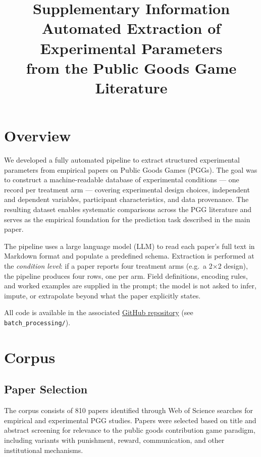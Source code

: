 \documentclass[11pt,a4paper]{article}
\title{\textbf{Supplementary Information}\\[0.5em]
  \large Automated Extraction of Experimental Parameters\\
  from the Public Goods Game Literature}
\author{}
\date{}
\begin{document}
\maketitle
\tableofcontents
\newpage

\section{Overview}
\label{sec:overview}

We developed a fully automated pipeline to extract structured experimental parameters from empirical papers on Public Goods Games (PGGs). The goal was to construct a machine-readable database of experimental conditions — one record per treatment arm — covering experimental design choices, independent and dependent variables, participant characteristics, and data provenance. The resulting dataset enables systematic comparisons across the PGG literature and serves as the empirical foundation for the prediction task described in the main paper.

The pipeline uses a large language model (LLM) to read each paper's full text in Markdown format and populate a predefined schema. Extraction is performed at the \emph{condition level}: if a paper reports four treatment arms (e.g.\ a 2×2 design), the pipeline produces four rows, one per arm. Field definitions, encoding rules, and worked examples are supplied in the prompt; the model is not asked to infer, impute, or extrapolate beyond what the paper explicitly states.

All code is available in the associated
\href{https://github.com/robin-na/LLM-literature-prediction}{GitHub repository}
(see \texttt{batch\_processing/}).

\section{Corpus}
\label{sec:corpus}

\subsection{Paper Selection}

The corpus consists of 810 papers identified through Web of Science searches for empirical and experimental PGG studies. Papers were selected based on title and abstract screening for relevance to the public goods contribution game paradigm, including variants with punishment, reward, communication, and other institutional mechanisms.
\end{document}
